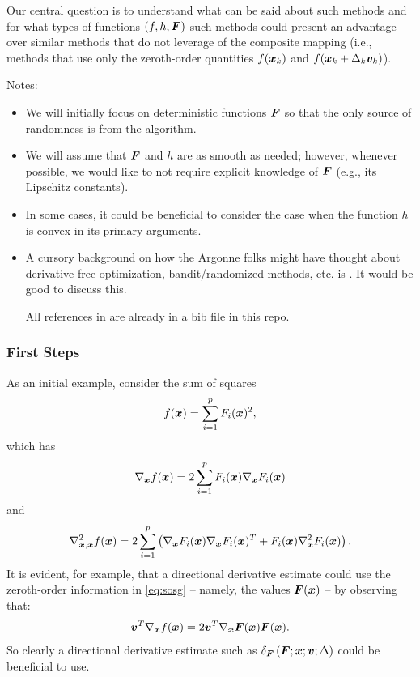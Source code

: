 \documentclass{article}
\begin{document}
Our central question is to understand what can be said about such methods and for what types of functions $(f,h,\bm{F})$ such methods could present an advantage over similar methods that do not leverage of the composite mapping (i.e., methods that use only the zeroth-order quantities  $f(\bm{x}_k)$ and $f(\bm{x}_k+\Delta_k \bm{v}_k)$). 

Notes:
\begin{itemize}
    \item We will initially focus on deterministic functions $\bm{F}$ so that the only source of randomness is from the algorithm. 

    \item We will assume that $\bm{F}$ and $h$ are as smooth as needed; however, whenever possible, we would like to not require explicit knowledge of $\bm{F}$ (e.g., its Lipschitz constants). 

    \item In some cases, it could be beneficial to consider the case when the function $h$ is convex in its primary arguments.
    
    \item A cursory background on how the Argonne folks might have thought about derivative-free optimization, bandit/randomized methods, etc. is \cite{LMW2019AN}. It would be good to discuss this. 
    
    All references in \cite{LMW2019AN} are already in a bib file in this repo.
\end{itemize}

\subsubsection{First Steps} 
As an initial example, consider the sum of squares
\begin{equation}
\label{eq:sosfun}
f(\bm{x}) = \sum_{i=1}^p F_i(\bm{x})^2,
\end{equation}
which has
\begin{equation}
\label{eq:sosg}
\nabla_{\bm{x}} f(\bm{x}) = 2 \sum_{i=1}^p  F_i(\bm{x}) \nabla_{\bm{x}} F_i(\bm{x})
\end{equation}
and
\begin{equation}
\label{eq:sosH}
\nabla^2_{\bm{x},\bm{x}} f(\bm{x}) = 2 \sum_{i=1}^p  \left(\nabla_{\bm{x}} F_i(\bm{x}) \nabla_{\bm{x}} F_i(\bm{x})^T + F_i(\bm{x}) \nabla^2_{\bm{x}} F_i(\bm{x}) \right).
\end{equation}
It is evident, for example, that a directional derivative estimate could use the zeroth-order information in \cref{eq:sosg} -- namely, the values $\bm{F}(\bm{x})$ -- by observing that:
\begin{equation}
 \bm{v}^T \nabla_{\bm{x}} f (\bm{x}) 
= 2 \bm{v}^T \nabla_{\bm{x}} \bm{F}(\bm{x}) \bm{F}(\bm{x}).
 \label{eq:fvdiff}
\end{equation}
So clearly a directional derivative estimate such as 
$ \delta_{\bm{F}}\left(\bm{F};\bm{x};\bm{v};\Delta\right)$ 
could be beneficial to use.
\end{document}
